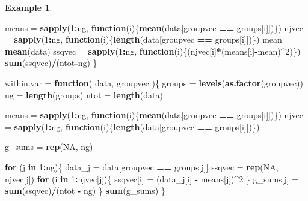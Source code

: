 \documentclass[
  openany]{book}
\newenvironment{Shaded}{\begin{snugshade}}{\end{snugshade}}
\newcommand{\ConstantTok}[1]{\textcolor[rgb]{0.56,0.35,0.01}{#1}}
\newcommand{\ControlFlowTok}[1]{\textcolor[rgb]{0.13,0.29,0.53}{\textbf{#1}}}
\newcommand{\DecValTok}[1]{\textcolor[rgb]{0.00,0.00,0.81}{#1}}
\newcommand{\FunctionTok}[1]{\textcolor[rgb]{0.13,0.29,0.53}{\textbf{#1}}}
\newcommand{\NormalTok}[1]{#1}
\newcommand{\OtherTok}[1]{\textcolor[rgb]{0.56,0.35,0.01}{#1}}
\newcommand{\SpecialCharTok}[1]{\textcolor[rgb]{0.81,0.36,0.00}{\textbf{#1}}}
\theoremstyle{definition}
\theoremstyle{definition}
\newtheorem{example}{Example}[chapter]
\theoremstyle{definition}
\theoremstyle{definition}
\theoremstyle{remark}
\begin{document}
\begin{example}
\begin{Shaded}
\begin{Highlighting}[]
  
\NormalTok{  means }\OtherTok{=} \FunctionTok{sapply}\NormalTok{(}\DecValTok{1}\SpecialCharTok{:}\NormalTok{ng, }\ControlFlowTok{function}\NormalTok{(i)\{}\FunctionTok{mean}\NormalTok{(data[groupvec }\SpecialCharTok{==}\NormalTok{ groups[i]])\})}
\NormalTok{  njvec }\OtherTok{=} \FunctionTok{sapply}\NormalTok{(}\DecValTok{1}\SpecialCharTok{:}\NormalTok{ng, }\ControlFlowTok{function}\NormalTok{(i)\{}\FunctionTok{length}\NormalTok{(data[groupvec }\SpecialCharTok{==}\NormalTok{ groups[i]])\})}
\NormalTok{  mean }\OtherTok{=} \FunctionTok{mean}\NormalTok{(data)}
\NormalTok{  ssqvec }\OtherTok{=} \FunctionTok{sapply}\NormalTok{(}\DecValTok{1}\SpecialCharTok{:}\NormalTok{ng, }\ControlFlowTok{function}\NormalTok{(i)\{(njvec[i]}\SpecialCharTok{*}\NormalTok{(means[i]}\SpecialCharTok{{-}}\NormalTok{mean)}\SpecialCharTok{\^{}}\DecValTok{2}\NormalTok{)\})}
  \FunctionTok{sum}\NormalTok{(ssqvec)}\SpecialCharTok{/}\NormalTok{(ntot}\SpecialCharTok{{-}}\NormalTok{ng)}
\NormalTok{\}}

\NormalTok{within.var }\OtherTok{=} \ControlFlowTok{function}\NormalTok{(}
\NormalTok{    data,}
\NormalTok{    groupvec}
\NormalTok{)\{}
\NormalTok{  groups }\OtherTok{=} \FunctionTok{levels}\NormalTok{(}\FunctionTok{as.factor}\NormalTok{(groupvec))}
\NormalTok{  ng }\OtherTok{=} \FunctionTok{length}\NormalTok{(groups)}
\NormalTok{  ntot }\OtherTok{=} \FunctionTok{length}\NormalTok{(data)}
  
\NormalTok{  means }\OtherTok{=} \FunctionTok{sapply}\NormalTok{(}\DecValTok{1}\SpecialCharTok{:}\NormalTok{ng, }\ControlFlowTok{function}\NormalTok{(i)\{}\FunctionTok{mean}\NormalTok{(data[groupvec }\SpecialCharTok{==}\NormalTok{ groups[i]])\})}
\NormalTok{  njvec }\OtherTok{=} \FunctionTok{sapply}\NormalTok{(}\DecValTok{1}\SpecialCharTok{:}\NormalTok{ng, }\ControlFlowTok{function}\NormalTok{(i)\{}\FunctionTok{length}\NormalTok{(data[groupvec }\SpecialCharTok{==}\NormalTok{ groups[i]])\})}


\NormalTok{  g\_sums }\OtherTok{=} \FunctionTok{rep}\NormalTok{(}\ConstantTok{NA}\NormalTok{, ng)}
  
  \ControlFlowTok{for}\NormalTok{ (j }\ControlFlowTok{in} \DecValTok{1}\SpecialCharTok{:}\NormalTok{ng)\{}
\NormalTok{    data\_j }\OtherTok{=}\NormalTok{ data[groupvec }\SpecialCharTok{==}\NormalTok{ groups[j]]}
\NormalTok{    ssqvec }\OtherTok{=} \FunctionTok{rep}\NormalTok{(}\ConstantTok{NA}\NormalTok{, njvec[j])}
    \ControlFlowTok{for}\NormalTok{ (i }\ControlFlowTok{in} \DecValTok{1}\SpecialCharTok{:}\NormalTok{njvec[j])\{}
\NormalTok{      ssqvec[i] }\OtherTok{=}\NormalTok{ (data\_j[i] }\SpecialCharTok{{-}}\NormalTok{ means[j])}\SpecialCharTok{\^{}}\DecValTok{2}
\NormalTok{    \}}
\NormalTok{    g\_sums[j] }\OtherTok{=} \FunctionTok{sum}\NormalTok{(ssqvec)}\SpecialCharTok{/}\NormalTok{(ntot }\SpecialCharTok{{-}}\NormalTok{ ng)}
\NormalTok{  \}}
  \FunctionTok{sum}\NormalTok{(g\_sums)}
\NormalTok{\}}
\end{Highlighting}
\end{Shaded}


\end{example}
\end{document}
